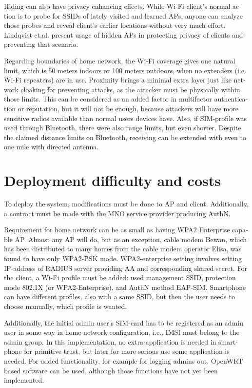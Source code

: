 \documentclass[12pt,a4paper,english]{tutthesis}
\begin{document}
\begin{otherlanguage}{english}
 Hiding can also have privacy enhancing effects.
While Wi-Fi client's normal action is to probe for SSIDs of lately visited
and learned APs, anyone can analyze those probes and reveal client's
earlier locations without very much effort.
Lindqvist et.al.\cite{hidden-wlan} present usage of hidden
APs in protecting privacy of clients and preventing that scenario.



Regarding boundaries of home network, the Wi-Fi coverage gives 
one natural limit, which is 50 meters indoors or 100 meters outdoors,
when no extenders (i.e. Wi-Fi repeaters) are in use.
Proximity brings a minimal extra layer just like network cloaking 
for preventing attacks, as the attacker must be physically within
those limits.
This can be considered as an added factor in multifactor
authentication or reputation, but it will not be enough, because
attackers will have more sensitive  radios available than normal users
devices have. 
Also, if SIM-profile was used through Bluetooth, there were also
range limits, but even shorter. Despite the claimed distance limits
on Bluetooth, receiving can be extended with even to one mile with
directed antenna\cite{SANS-bluetooth-2007}.




\section{Deployment difficulty and costs}
\label{sec-6-2}

To deploy the system, modifications must be done to AP and client.
Additionally, a contract must be made with the MNO service
provider producing AuthN.

Requirement for home network can be as small as having WPA2 Enterprise capable
AP. Almost any AP will do, but as an exception, cable modem Bewan, which 
has been distributed to many homes from the cable modem operator Elisa, was found to have only WPA2-PSK mode.
WPA2-enterprise setting involves setting IP-address of RADIUS server providing 
AA and corresponding shared secret.
For  the client, a Wi-Fi profile must be added: used management SSID,
protection mode 802.1X (or WPA2-Enterprise), and AuthN method EAP-SIM.
Smartphone can have different profiles, also with a same SSID, but
then the user needs to choose manually, which profile is wanted.

Additionally, the initial admin user's SIM-card has to be registered as an
admin user in some way in home network 
configuration, i.e., IMSI must belong to the admin group.
In this implementation, no extra application is needed in smartphone
for primitive trust, but later for more serious use some application is needed.
For added functionality, for example for logging admins out, OpenWRT
based software can be used, although those functions have not yet been
implemented.






\end{otherlanguage}
\end{document}
